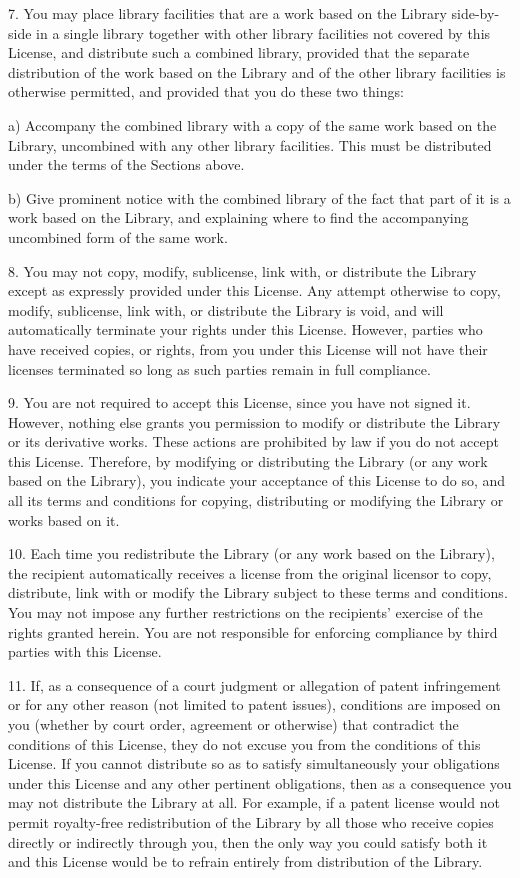7. You may place library facilities that are a work based on the Library side-by-side in a single library together with other library facilities not covered by this License, and distribute such a combined library, provided that the separate distribution of the work based on the Library and of the other library facilities is otherwise permitted, and provided that you do these two things:

a) Accompany the combined library with a copy of the same work based on the Library, uncombined with any other library facilities. This must be distributed under the terms of the Sections above.

b) Give prominent notice with the combined library of the fact that part of it is a work based on the Library, and explaining where to find the accompanying uncombined form of the same work.

8. You may not copy, modify, sublicense, link with, or distribute the Library except as expressly provided under this License. Any attempt otherwise to copy, modify, sublicense, link with, or distribute the Library is void, and will automatically terminate your rights under this License. However, parties who have received copies, or rights, from you under this License will not have their licenses terminated so long as such parties remain in full compliance.

9. You are not required to accept this License, since you have not signed it. However, nothing else grants you permission to modify or distribute the Library or its derivative works. These actions are prohibited by law if you do not accept this License. Therefore, by modifying or distributing the Library (or any work based on the Library), you indicate your acceptance of this License to do so, and all its terms and conditions for copying, distributing or modifying the Library or works based on it.

10. Each time you redistribute the Library (or any work based on the Library), the recipient automatically receives a license from the original licensor to copy, distribute, link with or modify the Library subject to these terms and conditions. You may not impose any further restrictions on the recipients' exercise of the rights granted herein. You are not responsible for enforcing compliance by third parties with this License.

11. If, as a consequence of a court judgment or allegation of patent infringement or for any other reason (not limited to patent issues), conditions are imposed on you (whether by court order, agreement or otherwise) that contradict the conditions of this License, they do not excuse you from the conditions of this License. If you cannot distribute so as to satisfy simultaneously your obligations under this License and any other pertinent obligations, then as a consequence you may not distribute the Library at all. For example, if a patent license would not permit royalty-free redistribution of the Library by all those who receive copies directly or indirectly through you, then the only way you could satisfy both it and this License would be to refrain entirely from distribution of the Library.

